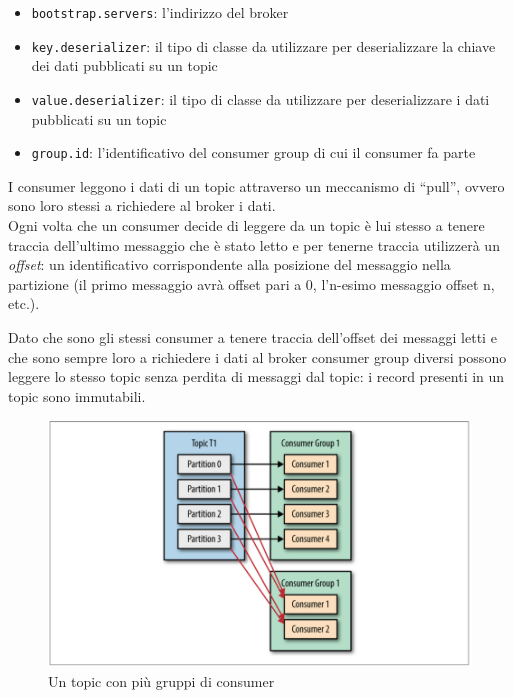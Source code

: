 \documentclass[]{article}
\providecommand{\tightlist}{%
  \setlength{\itemsep}{0pt}\setlength{\parskip}{0pt}}
\begin{document}
\begin{itemize}
\tightlist
\item
  \texttt{bootstrap.servers}: l'indirizzo del broker
\item
  \texttt{key.deserializer}: il tipo di classe da utilizzare per
  deserializzare la chiave dei dati pubblicati su un topic
\item
  \texttt{value.deserializer}: il tipo di classe da utilizzare per
  deserializzare i dati pubblicati su un topic
\item
  \texttt{group.id}: l'identificativo del consumer group di cui il
  consumer fa parte
\end{itemize}

I consumer leggono i dati di un topic attraverso un meccanismo di
``pull'', ovvero sono loro stessi a richiedere al broker i dati.\\
Ogni volta che un consumer decide di leggere da un topic è lui stesso a
tenere traccia dell'ultimo messaggio che è stato letto e per tenerne
traccia utilizzerà un \emph{offset}: un identificativo corrispondente
alla posizione del messaggio nella partizione (il primo messaggio avrà
offset pari a 0, l'n-esimo messaggio offset n, etc.).

Dato che sono gli stessi consumer a tenere traccia dell'offset dei
messaggi letti e che sono sempre loro a richiedere i dati al broker
consumer group diversi possono leggere lo stesso topic senza perdita di
messaggi dal topic: i record presenti in un topic sono immutabili.

\begin{figure}
\centering
\includegraphics[width=1.00000\textwidth]{../images/consumer-groups.png}
\caption{Un topic con più gruppi di consumer \label{figure_3}}
\end{figure}
\end{document}

